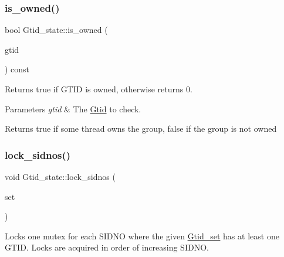 \subsubsection{\texorpdfstring{is\+\_\+owned()}{is\_owned()}}
{\footnotesize\ttfamily bool Gtid\+\_\+state\+::is\+\_\+owned (\begin{DoxyParamCaption}\item[{const \mbox{\hyperlink{structGtid}{Gtid}} \&}]{gtid }\end{DoxyParamCaption}) const\hspace{0.3cm}{\ttfamily [inline]}}

Returns true if G\+T\+ID is owned, otherwise returns 0.


\begin{DoxyParams}{Parameters}
{\em gtid} & The \mbox{\hyperlink{structGtid}{Gtid}} to check. \\
\hline
\end{DoxyParams}
\begin{DoxyReturn}{Returns}
true if some thread owns the group, false if the group is not owned 
\end{DoxyReturn}
\mbox{\label{classGtid__state_a774c7aef129010303e01c1be2b588814}} 
\subsubsection{\texorpdfstring{lock\+\_\+sidnos()}{lock\_sidnos()}}
{\footnotesize\ttfamily void Gtid\+\_\+state\+::lock\+\_\+sidnos (\begin{DoxyParamCaption}\item[{const \mbox{\hyperlink{classGtid__set}{Gtid\+\_\+set}} $\ast$}]{set }\end{DoxyParamCaption})}

Locks one mutex for each S\+I\+D\+NO where the given \mbox{\hyperlink{classGtid__set}{Gtid\+\_\+set}} has at least one G\+T\+ID. Locks are acquired in order of increasing S\+I\+D\+NO. \mbox{\label{classGtid__state_a66fe208121f5e1de1f180f10558d8fec}} 
